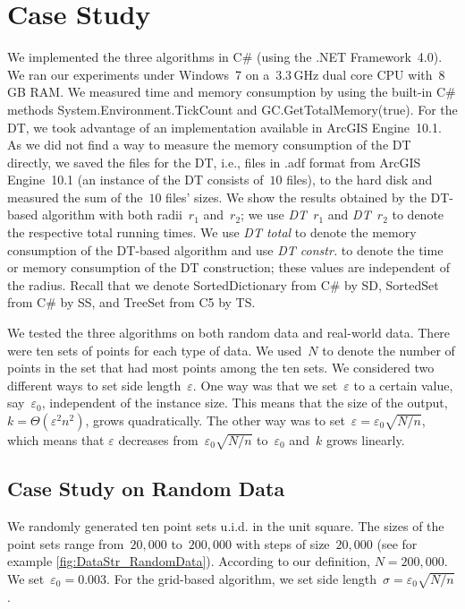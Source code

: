 \section{Case Study}\label{sec:DataStr_CaseStudy}
We implemented the three algorithms 
in C\# (using the .NET Framework~4.0).
We ran our experiments under 
Windows~7 on a~$3.3\,$GHz dual core CPU with~$8\,$GB RAM. 
We measured time and memory consumption by using 
the built-in C\# methods System.Environment.TickCount 
and GC.GetTotalMemory(true). 
For the DT, we took advantage of 
an implementation available in ArcGIS Engine~10.1.
As we did not find a way 
to measure the memory consumption of the DT directly, 
we saved the files for the DT, i.e., files in .adf format 
from ArcGIS Engine~10.1 
(an instance of the DT consists of~$10$ files), 
to the hard disk and 
measured the sum of the~$10$ files' sizes. 
We show the results obtained by the DT-based algorithm 
with both radii~$r_{1}$ and~$r_{2}$; 
we use \emph{DT~$r_1$} and \emph{DT~$r_2$} 
to denote the respective total running times. 
We use \emph{DT total} to denote 
the memory consumption of the DT-based algorithm 
and use \emph{DT constr.} to denote 
the time or memory consumption of the DT construction; 
these values are independent of the radius.
Recall that we denote SortedDictionary from C\# by SD,
SortedSet from C\# by SS, and TreeSet from C5 by TS.

We tested the three algorithms on both random data and 
real-world data. 
There were ten sets of points for each type of data. 
We used~$N$ to denote the number of points 
in the set that had most points among the ten sets. 
We considered two different ways 
to set side length~$\varepsilon$. 
One way was that we set~$\varepsilon$ to a certain value, 
say~$\varepsilon_{0}$, independent of the instance size. 
This means that the size of the output, 
$k=\Theta (\varepsilon ^{2}n^{2})$, grows quadratically. 
The other way was to set~$\varepsilon =\varepsilon_{0}\sqrt{N/n}$, 
which means that $\varepsilon$ decreases 
from~$\varepsilon_{0}\sqrt{N/n}$ to~$\varepsilon_{0}$ 
and~$k$ grows linearly.



\subsection{Case Study on Random Data}
\label{sec:DataStr_CaseStudy_RandomData} 
We randomly generated ten point sets u.i.d. 
in the unit square. 
The sizes of the point sets range 
from~$20{,}000$ to~$200{,}000$ 
with steps of size~$20{,}000$
(see for example \fig\ref{fig:DataStr_RandomData}).
According to our definition, $N=200{,}000$. 
We set~$\varepsilon_{0}=0.003$. 
For the grid-based algorithm,
we set side length~$\sigma=\varepsilon_{0}\sqrt{N/n}$.

